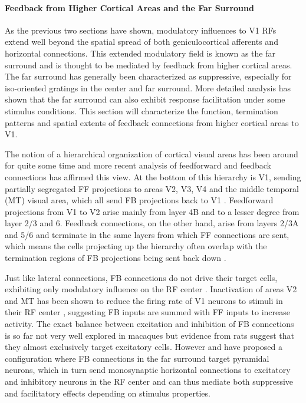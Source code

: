\paragraph{Feedback from Higher Cortical Areas and the Far Surround}

As the previous two sections have shown, modulatory influences to V1
RFs extend well beyond the spatial spread of both geniculocortical
afferents and horizontal connections. This extended modulatory field
is known as the far surround and is thought to be mediated by feedback
from higher cortical areas. The far surround has generally been
characterized as suppressive, especially for iso-oriented gratings in
the center and far surround. More detailed analysis has shown that the
far surround can also exhibit response facilitation under some
stimulus conditions. This section will characterize the function,
termination patterns and spatial extents of feedback connections from
higher cortical areas to V1.

The notion of a hierarchical organization of cortical visual areas has
been around for quite some time and more recent analysis of
feedforward and feedback connections has affirmed this view. At the
bottom of this hierarchy is V1, sending partially segregated FF
projections to areas V2, V3, V4 and the middle temporal (MT) visual area,
which all send FB projections back to V1
\citep{Felleman1991}. Feedforward projections from V1 to V2 arise
mainly from layer 4B and to a lesser degree from layer 2/3 and
6. Feedback connections, on the other hand, arise from layers 2/3A and
5/6 and terminate in the same layers from which FF connections are
sent, which means the cells projecting up the hierarchy often overlap
with the termination regions of FB projections being sent back down
\citep{Angelucci2002}.

Just like lateral connections, FB connections do not drive their target
cells, exhibiting only modulatory influence on the RF center
\citep{Bullier2001a}. Inactivation of areas V2 and MT has been shown
to reduce the firing rate of V1 neurons to stimuli in their RF center
\citep{Hupe1998}, suggesting FB inputs are summed with FF inputs to
increase activity. The exact balance between excitation and inhibition
of FB connections is so far not very well explored in macaques but
evidence from rats suggest that they almost exclusively target
excitatory cells. However \cite{Angelucci2006} and \cite{Schwabe2006}
have proposed a configuration where FB connections in the far surround
target pyramidal neurons, which in turn send monosynaptic horizontal
connections to excitatory and inhibitory neurons in the RF center and
can thus mediate both suppressive and facilitatory effects depending
on stimulus properties.

